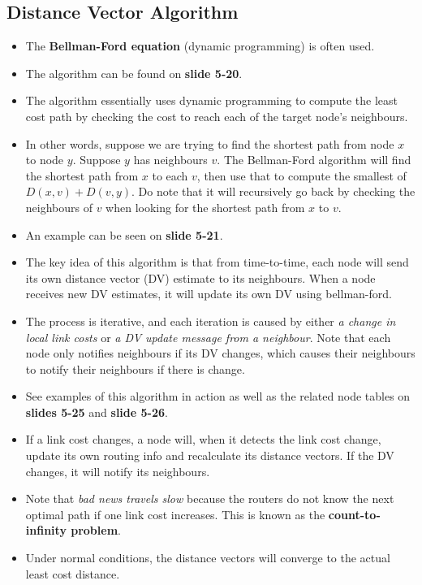 \documentclass{article}
\begin{document}
\subsection{Distance Vector Algorithm}

\begin{itemize}
\item The {\bf Bellman-Ford equation} (dynamic programming) is often used.
\item The algorithm can be found on {\bf slide 5-20}.
\item The algorithm essentially uses dynamic programming to compute the least cost path by checking the cost to reach each of the target node's neighbours.
\item In other words, suppose we are trying to find the shortest path from node $x$ to node $y$. Suppose $y$ has neighbours $v$. The Bellman-Ford algorithm will find the shortest path from $x$ to each $v$, then use that to compute the smallest of $D(x,v) + D(v,y)$. Do note that it will recursively go back by checking the neighbours of $v$ when looking for the shortest path from $x$ to $v$.
\item An example can be seen on {\bf slide 5-21}.
\item The key idea of this algorithm is that from time-to-time, each node will send its own distance vector (DV) estimate to its neighbours. When a node receives new DV estimates, it will update its own DV using bellman-ford.
\item The process is iterative, and each iteration is caused by either \emph{a change in local link costs} or \emph{a DV update message from a neighbour}. Note that each node only notifies neighbours if its DV changes, which causes their neighbours to notify their neighbours if there is change.
\item See examples of this algorithm in action as well as the related node tables on {\bf slides 5-25} and {\bf slide 5-26}.
\item If a link cost changes, a node will, when it detects the link cost change, update its own routing info and recalculate its distance vectors. If the DV changes, it will notify its neighbours.
\item Note that \emph{bad news travels slow} because the routers do not know the next optimal path if one link cost increases. This is known as the {\bf count-to-infinity problem}.
\item Under normal conditions, the distance vectors will converge to the actual least cost distance.
\end{itemize}
\end{document}
